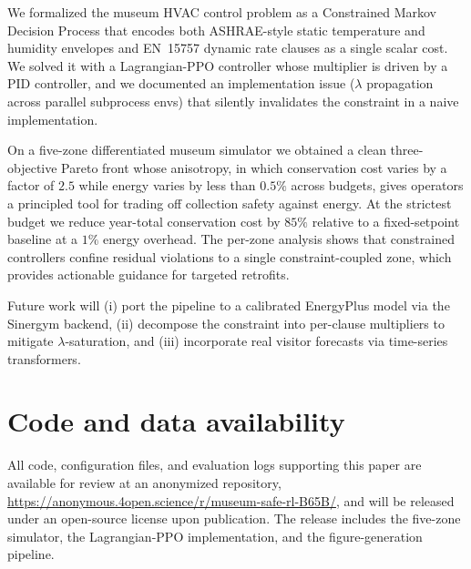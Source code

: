 \documentclass[11pt,a4paper]{article}
\begin{document}
We formalized the museum HVAC control problem as a Constrained
Markov Decision Process that encodes both ASHRAE-style static
temperature and humidity envelopes and EN~15757 dynamic rate clauses
as a single scalar cost. We solved it with a Lagrangian-PPO
controller whose multiplier is driven by a PID controller, and we
documented an implementation issue ($\lambda$ propagation across
parallel subprocess envs) that silently invalidates the constraint
in a naive implementation.

On a five-zone differentiated museum simulator we obtained a clean
three-objective Pareto front whose anisotropy, in which conservation
cost varies by a factor of $2.5$ while energy varies by less than
$0.5\%$ across budgets, gives operators a principled tool for trading
off collection safety against energy. At the strictest budget we
reduce year-total conservation cost by $85\%$ relative to a
fixed-setpoint baseline at a $1\%$ energy overhead. The per-zone
analysis shows that constrained controllers confine residual
violations to a single constraint-coupled zone, which provides
actionable guidance for targeted retrofits.

Future work will (i) port the pipeline to a calibrated EnergyPlus
model via the Sinergym backend, (ii) decompose the constraint into
per-clause multipliers to mitigate $\lambda$-saturation, and (iii)
incorporate real visitor forecasts via time-series transformers.


\section*{Code and data availability}

All code, configuration files, and evaluation logs supporting this
paper are available for review at an anonymized repository,
\url{https://anonymous.4open.science/r/museum-safe-rl-B65B/}, and will
be released under an open-source license upon publication. The release
includes the five-zone simulator, the Lagrangian-PPO implementation,
and the figure-generation pipeline.



\end{document}
